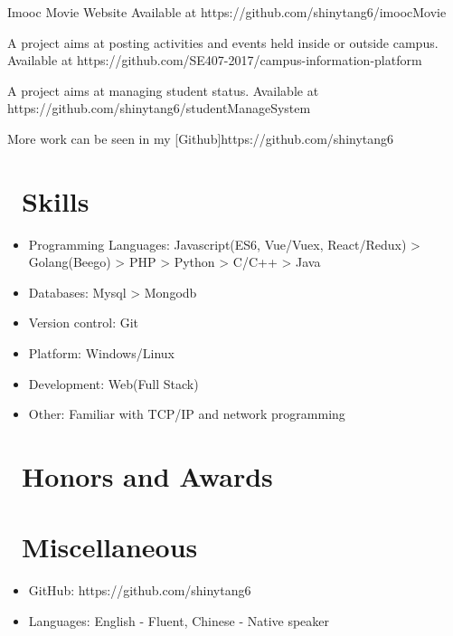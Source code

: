 \documentclass{resume}
\begin{document}
Imooc Movie Website
Available at https://github.com/shinytang6/imoocMovie

A project aims at posting activities and events held inside or outside campus.
Available at https://github.com/SE407-2017/campus-information-platform

A project aims at managing student status.
Available at https://github.com/shinytang6/studentManageSystem

More work can be seen in my [Github]{https://github.com/shinytang6}

\section{\faCogs\ Skills}
\begin{itemize}[parsep=0.5ex]
  \item Programming Languages: Javascript(ES6, Vue/Vuex, React/Redux) > Golang(Beego) > PHP > Python > C/C++ > Java
  \item Databases: Mysql > Mongodb
  \item Version control: Git
  \item Platform: Windows/Linux
  \item Development: Web(Full Stack)
  \item Other: Familiar with TCP/IP and network programming
\end{itemize}

\section{\faHeartO\ Honors and Awards}

\section{\faInfo\ Miscellaneous}
\begin{itemize}[parsep=0.5ex]
  \item GitHub: https://github.com/shinytang6
  \item Languages: English - Fluent, Chinese - Native speaker
\end{itemize}

%
%
\end{document}
